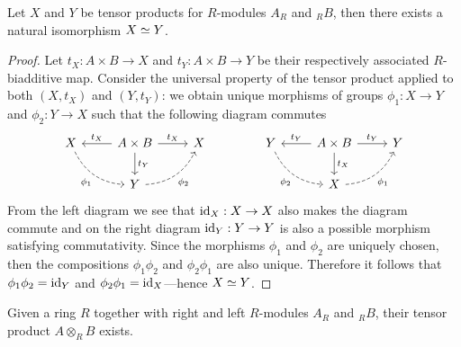 \begin{lemma}
\label{lem:tensor-product-unique-up-to-iso}
Let \(X\) and \(Y\) be tensor products for \(R\)-modules \(A_R\) and \({}_RB\),
then there exists a natural isomorphism \(X \simeq Y\).
\end{lemma}

\begin{proof}
Let \(t_X: A \times B \to X\) and \(t_Y: A \times B \to Y\) be their
respectively associated \(R\)-biadditive map. Consider the universal property of
the tensor product applied to both \((X, t_X)\) and \((Y, t_Y)\): we obtain
unique morphisms of groups \(\phi_1: X \to Y\) and \(\phi_2: Y \to X\) such that
the following diagram commutes
\[
\begin{tikzcd}
X \ar[rd, dashed, bend right, "\phi_1"']
&A \times B \ar[l, "t_X"']
\ar[d, "t_Y"]
\ar[r, "t_X"]
&X
\\
&Y \ar[ru, "\phi_2"', dashed, bend right] &
\end{tikzcd}
\qquad
\qquad
\begin{tikzcd}
Y \ar[rd, dashed, bend right, "\phi_2"']
&A \times B \ar[l, "t_Y"']
\ar[d, "t_X"]
\ar[r, "t_Y"]
&Y
\\
&X \ar[ru, "\phi_1"', dashed, bend right] &
\end{tikzcd}
\]
From the left diagram we see that \(\operatorname{id}_X: X \to X\) also makes the diagram
commute and on the right diagram \(\operatorname{id}_Y: Y \to Y\) is also a possible morphism
satisfying commutativity. Since the morphisms \(\phi_1\) and \(\phi_2\) are
uniquely chosen, then the compositions \(\phi_1 \phi_2\) and \(\phi_2 \phi_1\)
are also unique. Therefore it follows that \(\phi_1 \phi_2 = \operatorname{id}_Y\) and
\(\phi_2 \phi_1 = \operatorname{id}_X\)---hence \(X \simeq Y\).
\end{proof}

\begin{lemma}[Existence]
\label{lem:tensor-product-exists}
Given a ring \(R\) together with right and left \(R\)-modules \(A_R\) and
\({}_RB\), their tensor product \(A \otimes_R B\) exists.
\end{lemma}

